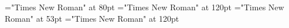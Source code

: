 \documentclass[a4paper]{article}
\begin{document}
 
\pagestyle{plain} 
\font\pa="Times New Roman" at 80pt
\font\childapa="Times New Roman" at 120pt
\font\childbpa="Times New Roman" at 53pt
\font\childaenpa="Times New Roman" at 120pt

\pagestyle{fancy} 


\end{document}
